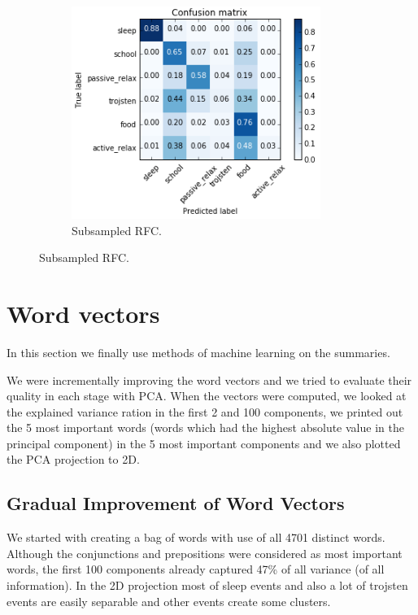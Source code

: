 \documentclass[a4paper, 12pt]{article}
\begin{document}
\begin{figure}[H]
\begin{subfigure}{.5\textwidth}
  \includegraphics[width=1\linewidth]{cm5.png}
  \caption{Subsampled RFC.}
\end{subfigure}
\end{figure}


\section{Word vectors}
In this section we finally use methods of machine learning on the summaries.

We were incrementally improving the word vectors and we tried to evaluate
their quality in each stage with PCA. When the vectors were computed, we 
looked at the explained variance ration in the first 2 and 100 components,
we printed out the 5 most important words (words which had the highest
absolute value in the principal component) in the 5 most important components
and we also plotted the PCA projection to 2D.

\subsection{Gradual Improvement of Word Vectors}
We started with creating a bag of words with use of all 4701 distinct words.
Although the conjunctions and prepositions were considered as most important words,
the first 100 components already captured 47\% of all variance (of all information).
In the 2D projection most of sleep events and also a lot of trojsten
events are easily separable and other events create some clusters.
\end{document}
